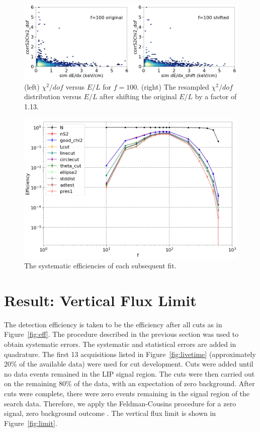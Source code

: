 \begin{figure}[htbp]
\begin{center}
\includegraphics[width=\textwidth]{figures/lips/shift_example.png}
\caption{(left) $\chi^{2}/dof$ versus $E/L$ for $f=100$. (right) The resampled $\chi^{2}/dof$ distribution versus $E/L$ after shifting the original $E/L$ by a factor of 1.13.}
\label{fig:shift_example}
\end{center}
\end{figure}
 
 \begin{figure}[htbp]
\begin{center}
\includegraphics[width=\textwidth]{figures/lips/sys_eff.png}
\caption{The systematic efficiencies of each subsequent fit.}
\label{fig:sys_eff}
\end{center}
\end{figure}
 
 
\FloatBarrier
\section{Result: Vertical Flux Limit}
The detection efficiency is taken to be the efficiency after all cuts as in Figure~\ref{fig:eff}. The procedure described in the previous section was used to obtain systematic errors. The systematic and statistical errors are added in quadrature. The first 13 acquisitions listed in Figure~\ref{fig:livetime} (approximately 20\% of the available data) were used for cut development. Cuts were added until no data events remained in the \ac{LIP} signal region. The cuts were then carried out on the remaining 80\% of the data, with an expectation of zero background. After cuts were complete, there were zero events remaining in the signal region of the search data. Therefore, we apply the Feldman-Cousins procedure for a zero signal, zero background outcome \cite{Feldman1998}. The vertical flux limit is shown in Figure~\ref{fig:limit}.


